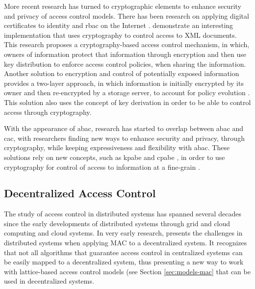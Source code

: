 More recent research has turned to cryptographic elements to enhance security and privacy of access control models. There has been research on applying digital certificates to identity \cite{park_binding_2000} and \gls{rbac} on the Internet \cite{park_rbac_1999}. \citeauthor{miklau_controlling_2003} \cite{miklau_controlling_2003} demonstrate an interesting implementation that uses cryptography to control access to XML documents. This research proposes a cryptography-based access control mechanism, in which, owners of information protect that information through encryption and then use key distribution to enforce access control policies, when sharing the information. Another solution to encryption and control of potentially exposed information provides a two-layer approach, in which information is initially encrypted by its owner and then re-encrypted by a storage server, to account for policy evolution \cite{di_vimercati_over-encryption:_2007}. This solution also uses the concept of key derivation in order to be able to control access through cryptography.

With the appearance of \gls{abac}, research has started to overlap between \gls{abac} and \gls{cac}, with researchers finding new ways to enhance security and privacy, through cryptography, while keeping expressiveness and flexibility with \gls{abac}. These solutions rely on new concepts, such as \gls{kpabe} \cite{goyal_attribute-based_2006} and \gls{cpabe} \cite{bethencourt_ciphertext-policy_2007}, in order to use cryptography for control of access to information at a fine-grain \cite{wan_hasbe:_2012, ruj_privacy_2012, wang_hierarchical_2010}.

\subsection{Decentralized Access Control}

The study of access control in distributed systems has spanned several decades since the early developments of distributed systems through grid and cloud computing and cloud systems. In very early research, \citeauthor{karger_non-discretionary_1977} \cite{karger_non-discretionary_1977} presents the challenges in distributed systems when applying MAC to a decentralized system. It recognizes that not all algorithms that guarantee access control in centralized systems can be easily mapped to a decentralized system, thus presenting a new way to work with lattice-based access control models (see Section \ref{sec:models-mac} that can be used in decentralized systems.

